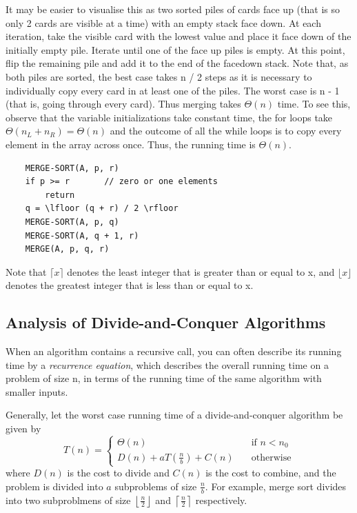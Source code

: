\documentclass[12pt]{article}
\begin{document}
It may be easier to visualise this as two sorted piles of cards face up (that is so only 2 cards are visible at a time) with an empty stack face down. At each iteration,
take the visible card with the lowest value and place it face down of the initially empty pile. Iterate until one of the face up piles is empty.
At this point, flip the remaining pile and add it to the end of the facedown stack. Note that, as both piles are sorted,
the best case takes n / 2 steps as it is necessary to individually copy every card in at least one of the
piles. The worst case is n - 1 (that is, going through every card). Thus merging takes $\Theta(n)$ time. To see this,
observe that the variable initializations take constant time, the for loops take $\Theta(n_L + n_R) = \Theta(n)$
and the outcome of all the while loops is to copy every element in the array across once. Thus, the running time is $\Theta(n)$.

\begin{lstlisting}
    MERGE-SORT(A, p, r)
    if p >= r       // zero or one elements
        return
    q = \lfloor (q + r) / 2 \rfloor
    MERGE-SORT(A, p, q)
    MERGE-SORT(A, q + 1, r)
    MERGE(A, p, q, r)
\end{lstlisting}
Note that $\lceil x \rceil$ denotes the least integer that is greater than or equal to x, and $\lfloor x \rfloor$
denotes the greatest integer that is less than or equal to x.

\subsection{Analysis of Divide-and-Conquer Algorithms}
When an algorithm contains a recursive call, you can often describe its running time by a \textit{recurrence equation}, which
describes the overall running time on a problem of size n, in terms of the running time of the same algorithm with smaller inputs.

Generally, let the worst case running time of a divide-and-conquer algorithm be given by
\[ T(n) =
  \begin{cases}
    \Theta(n)       & \quad \text{if } n < n_0\\
    D(n) + aT(\frac{n}{b}) + C(n)  & \quad \text{otherwise}
  \end{cases}
\]
where $D(n)$ is the cost to divide and $C(n)$ is the cost to combine, and the problem is divided into
$a$ subproblems of size $\frac{n}{b}$. For example, merge sort divides into two subproblmens of size
$\left \lfloor \frac{n}{2} \right \rfloor$ and $\left \lceil \frac{n}{2} \right \rceil$ respectively.
\end{document}
